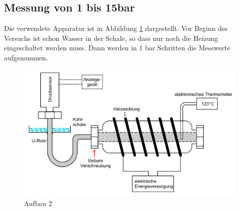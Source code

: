 \subsection{Messung von 1 bis 15bar}
Die verwendete Apparatur ist in Abbildung \ref{fig:aufbau2} dargestellt. Vor Beginn des Versuchs ist schon Wasser in der Schale, so dass nur noch die Heizung eingeschaltet
werden muss. Dann werden in 1 bar Schritten die Messwerte aufgenommen.
\begin{figure}
  \centering
  \includegraphics{Aufbau2.png}
  \caption{Aufbau 2 \cite{sample}}
  \label{fig:aufbau2}
\end{figure}